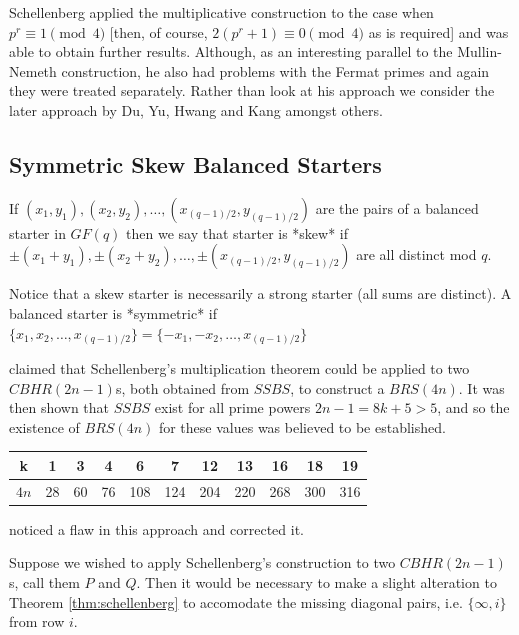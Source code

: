 \documentclass[11pt, a4paper]{book}\usepackage[]{graphicx}\usepackage[]{xcolor}
\begin{document}
Schellenberg applied the multiplicative construction to the
case when $p^r \equiv 1\pmod 4$ [then, of course,
$2(p^r + 1) \equiv 0\pmod 4$ as is required] and was able to
obtain further results. Although, as an interesting parallel
to the Mullin-Nemeth construction, he also had problems with
the Fermat primes and again they were treated separately.
Rather than look at his approach we consider the later
approach by Du, Yu, Hwang and Kang amongst others.

\subsection{Symmetric Skew Balanced Starters}

If $(x_1, y_1), (x_2, y_2),\ldots, (x_{(q - 1)/2}, y_{(q - 1)/2})$
are the pairs of a balanced starter in $GF(q)$ then we say
that starter is *skew* if
$\pm(x_1 + y_1), \pm(x_2 + y_2),\ldots, \pm(x_{(q - 1)/2}, y_{(q - 1)/2})$
are all distinct mod $q$.

Notice that a skew starter is necessarily a strong starter
(all sums are distinct).  A balanced starter is *symmetric* if
$\{x_1, x_2,\ldots, x_{(q - 1)/2}\} = \{-x_1, -x_2,\ldots, x_{(q - 1)/2}\}$

\cite{hwangCompleteBalancedHowell1984}
claimed that Schellenberg’s multiplication
theorem could be applied to two $CBHR(2n - 1)$s, both obtained
from $SSBS$, to construct a $BRS(4n)$. It was then shown
that $SSBS$ exist for all prime powers $2n - 1 = 8k + 5 > 5$,
and so the existence of $BRS(4n)$ for these values was
believed to be established.

\begin{center}
\begin{tabular}{|c|c|c|c|c|c|c|c|c|c|c|}
\hline
  k  &  1 &  3 &  4 &   6 &   7 &  12 &  13 &  16 &  18 & 19 \\ \hline
$4n$ & 28 & 60 & 76 & 108 & 124 & 204 & 220 & 268 & 300 & 316 \\ \hline
\end{tabular}
\end{center}

\cite{andersonConstructionBalancedRoom1999}
noticed a flaw in this approach and corrected it.

Suppose we wished to apply Schellenberg’s
construction to two $CBHR(2n - 1)$s, call them $P$ and $Q$.
Then it would be necessary to make a slight alteration to
Theorem \ref{thm:schellenberg} to accomodate the missing
diagonal pairs, i.e. $\{\infty, i\}$ from row $i$.
\end{document}
